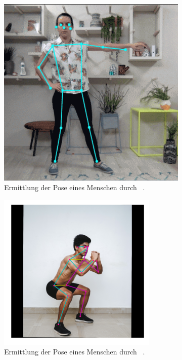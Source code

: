 \begin{figure}
    \centering
    \begin{subfigure}[t]{0.3\textwidth}
        \includegraphics[width=\textwidth]{gfx/posenet.png}
        \caption{Ermittlung der Pose eines Menschen durch ~\cite{Google2021}.}\label{fig:posenet}
    \end{subfigure}
    \begin{subfigure}[t]{0.3\textwidth}
        \includegraphics[width=\textwidth]{gfx/movenet.png}
        \caption{Ermittlung der Pose eines Menschen durch ~\cite{Google2021a}.}\label{fig:movenet}
    \end{subfigure}
    \caption[Posenbestimmung durch maschinelles Lernen]{}
    \label{fig:pose_estimation}
\end{figure}

